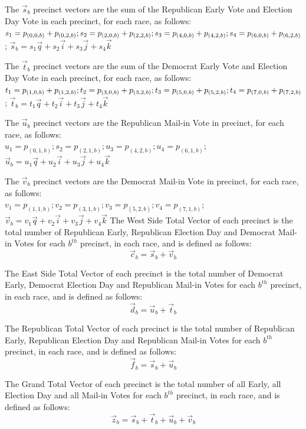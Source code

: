 \documentclass[preprint,13pt]{elsarticle}
\begin{document}
The $\vec{s}_b$ precinct vectors are the sum of the Republican Early Vote and Election Day Vote in each precinct, for each race, as follows:\\
$s_{1}=p_{(0,0,b)}+p_{(0,2,b)}; s_{2}=p_{(2,0,b)}+p_{(2,2,b)};\\
s_{3}=p_{(4,0,b)}+p_{(4,2,b)}; s_{4}=p_{(6,0,b)}+p_{(6,2,b)}$; $\vec{s}_{b}=s_{1}\vec{q}+s_{2}\vec{i}+s_{3}\vec{j}+s_{4}\vec{k}$

The $\vec{t}_b$ precinct vectors are the sum of the Democrat Early Vote and Election Day Vote in each precinct, for each race, as follows:\\
$t_{1}=p_{(1,0,b)}+p_{(1,2,b)}; t_{2}=p_{(3,0,b)}+p_{(3,2,b)};\\
t_{3}=p_{(5,0,b)}+p_{(5,2,b)}; t_{4}=p_{(7,0,b)}+p_{(7,2,b)}$; $\vec{t}_{b}=t_{1}\vec{q}+t_{2}\vec{i}+t_{3}\vec{j}+t_{4}\vec{k}$

The $\vec{u}_b$ precinct vectors are the Republican Mail-in Vote in precinct, for each race, as follows:\\
$u_{1}=p_{(0,1,b)}; s_{2}=p_{(2,1,b)}; u_{3}=p_{(4,2,b)}; u_{4}=p_{(6,1,b)}$; $\vec{u}_{b}=u_{1}\vec{q}+u_{2}\vec{i}+u_{3}\vec{j}+u_{4}\vec{k}$

The $\vec{v}_b$ precinct vectors are the Democrat Mail-in Vote in precinct, for each race, as follows:\\
$v_{1}=p_{(1,1,b)}; v_{2}=p_{(3,1,b)}; v_{3}=p_{(5,2,b)}; v_{4}=p_{(7,1,b)}$; $\vec{v}_{b}=v_{1}\vec{q}+v_{2}\vec{i}+v_{3}\vec{j}+v_{4}\vec{k}$
\newpage
The West Side Total Vector of each precinct is the total number of Republican Early, Republican Election Day and Democrat Mail-in Votes for each $b^{th}$ precinct, in each race, and is defined as follows:
$$\vec{c}_{b}=\vec{s}_{b}+\vec{v}_{b}$$

The East Side Total Vector of each precinct is the total number of Democrat Early, Democrat Election Day and Republican Mail-in Votes for each $b^{th}$ precinct, in each race, and is defined as follows:
$$\vec{d}_{b}=\vec{u}_{b}+\vec{t}_{b}$$

The Republican Total Vector of each precinct is the total number of Republican Early, Republican Election Day and Republican Mail-in Votes for each $b^{th}$ precinct, in each race, and is defined as follows:
$$\vec{f}_{b}=\vec{s}_{b}+\vec{u}_{b}$$

The Grand Total Vector of each precinct is the total number of all Early, all Election Day and all Mail-in Votes for each $b^{th}$ precinct, in each race, and is defined as follows:
$$\vec{z}_{b}=\vec{s}_{b}+\vec{t}_{b}+\vec{u}_{b}+\vec{v}_{b}$$
\end{document}
